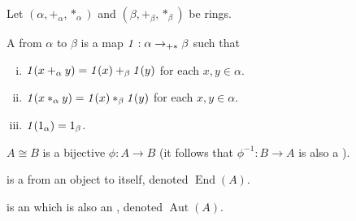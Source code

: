
\begin{definition}
    \label{RingHom}
    \leanok

    Let $(\alpha, +_\alpha, *_\alpha)$ and $(\beta, +_\beta, *_\beta)$ be rings.
    
    A  from $\alpha$ to $\beta$ is a map $\mathit{1} : \alpha \to_{+*} \beta$ such that

    \begin{enumerate}[(i)]
        \item $\mathit{1}(x +_{\alpha} y) = \mathit{1}(x) +_{\beta} \mathit{1}(y)$ for each $x,y \in \alpha$.
        \item $\mathit{1}(x *_{\alpha} y) = \mathit{1}(x) *_{\beta} \mathit{1}(y)$ for each $x,y \in \alpha$.
        \item $\mathit{1}(1_{\alpha}) = 1_{\beta}$.
    \end{enumerate}

\end{definition}

\begin{remark}
    \label{mk:homomorphism}

     $A \cong B$ is a bijective  $\phi : A \to B$
    (it follows that $\phi^{-1} : B \to A$ is also a ).

     is a  from an object to itself, denoted $\operatorname{End}(A)$.

     is an  which is also an , denoted $\operatorname{Aut}(A)$.

\end{remark}

